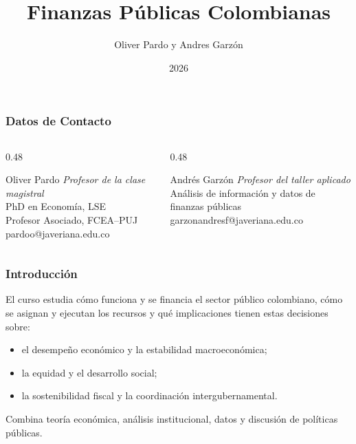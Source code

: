\documentclass{beamer}
\title[Finanzas P\'ublicas Colombianas]{Finanzas P\'ublicas Colombianas}
\author{Oliver Pardo y Andres Garzón}
\institute[PUJ]{Pontificia Universidad Javeriana}
\date{2026}
\begin{document}
\begin{frame}
  \titlepage
\end{frame}

\begin{frame}
  \frametitle{Datos de Contacto}
  \begin{columns}[T,onlytextwidth]
    \begin{column}{0.48\textwidth}
      \begin{block}{Oliver Pardo}
        \textit{Profesor de la clase magistral}\\[0.15cm]
        PhD en Econom\'ia, LSE\\
        Profesor Asociado, FCEA--PUJ\\[0.2cm]
        pardoo@javeriana.edu.co
      \end{block}
    \end{column}
    \begin{column}{0.48\textwidth}
      \begin{block}{Andr\'es Garz\'on}
        \textit{Profesor del taller aplicado}\\[0.15cm]
        An\'alisis de informaci\'on y datos de finanzas p\'ublicas\\[0.2cm]
        garzonandresf@javeriana.edu.co
      \end{block}
    \end{column}
  \end{columns}
\end{frame}


\begin{frame}
  \frametitle{Introducci\'on}
  El curso estudia c\'omo funciona y se financia el sector p\'ublico colombiano, c\'omo se asignan y ejecutan los recursos y qu\'e implicaciones tienen estas decisiones sobre:
  \begin{itemize}
    \item el desempe\~no econ\'omico y la estabilidad macroecon\'omica;
    \item la equidad y el desarrollo social;
    \item la sostenibilidad fiscal y la coordinaci\'on intergubernamental.
  \end{itemize}
  Combina teor\'ia econ\'omica, an\'alisis institucional, datos y discusi\'on de pol\'iticas p\'ublicas.
\end{frame}
\end{document}
